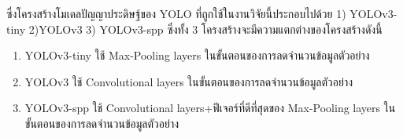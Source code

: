 \par ซึ่งโครงสร้างโมเดลปัญญาประดิษฐ์ของ YOLO ที่ถูกใช้ในงานวิจัยนี้ประกอบไปด้วย 1) YOLOv3-tiny 2)YOLOv3 3) YOLOv3-spp	ซึ่งทั้ง 3 โครงสร้างจะมีความแตกต่างของโครงสร้างดังนี้
\begin{enumerate}
	\setlength\itemsep{-0.25em}
	\item YOLOv3-tiny ใช้ Max-Pooling layers ในขั้นตอนของการลดจำนวนข้อมูลตัวอย่าง
	\item YOLOv3 ใช้ Convolutional layers ในขั้นตอนของการลดจำนวนข้อมูลตัวอย่าง
	\item YOLOv3-spp ใช้ Convolutional layers+ฟีเจอร์ที่ดีที่สุดของ Max-Pooling layers ในขั้นตอนของการลดจำนวนข้อมูลตัวอย่าง
\end{enumerate}

\begin{figure}[!ht]
    \centering
    \begin{subfigure}[b]{0.2\textwidth}
        \centering

\end{subfigure}
\end{figure}
